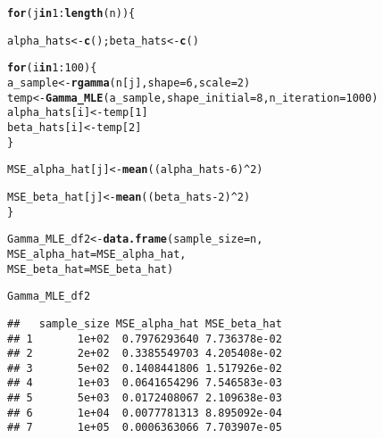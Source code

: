 \documentclass[11pt, a4paper]{article}\usepackage[]{graphicx}\usepackage[]{xcolor}
\makeatletter
\newcommand{\hlnum}[1]{\textcolor[rgb]{0.686,0.059,0.569}{#1}}%
\newcommand{\hlopt}[1]{\textcolor[rgb]{0,0,0}{#1}}%
\newcommand{\hldef}[1]{\textcolor[rgb]{0.345,0.345,0.345}{#1}}%
\newcommand{\hlkwa}[1]{\textcolor[rgb]{0.161,0.373,0.58}{\textbf{#1}}}%
\newcommand{\hlkwb}[1]{\textcolor[rgb]{0.69,0.353,0.396}{#1}}%
\newcommand{\hlkwc}[1]{\textcolor[rgb]{0.333,0.667,0.333}{#1}}%
\newcommand{\hlkwd}[1]{\textcolor[rgb]{0.737,0.353,0.396}{\textbf{#1}}}%
\newenvironment{kframe}{%
 \def\at@end@of@kframe{}%
 \ifinner\ifhmode%
  \def\at@end@of@kframe{\end{minipage}}%
  \begin{minipage}{\columnwidth}%
 \fi\fi%
 \def\FrameCommand##1{\hskip\@totalleftmargin \hskip-\fboxsep
 \colorbox{shadecolor}{##1}\hskip-\fboxsep
     \hskip-\linewidth \hskip-\@totalleftmargin \hskip\columnwidth}%
 \MakeFramed {\advance\hsize-\width
   \@totalleftmargin\z@ \linewidth\hsize
   \@setminipage}}%
 {\par\unskip\endMakeFramed%
 \at@end@of@kframe}
\newenvironment{knitrout}{}{} %
\makeatother
\begin{document}
\begin{knitrout}
\color{fgcolor}\begin{kframe}
\begin{alltt}
\hlkwa{for}\hldef{(j} \hlkwa{in} \hlnum{1}\hlopt{:}\hlkwd{length}\hldef{(n))\{}

  \hldef{alpha_hats} \hlkwb{<-} \hlkwd{c}\hldef{(); beta_hats} \hlkwb{<-} \hlkwd{c}\hldef{()}

  \hlkwa{for} \hldef{(i} \hlkwa{in} \hlnum{1}\hlopt{:}\hlnum{100}\hldef{) \{}
    \hldef{a_sample} \hlkwb{<-} \hlkwd{rgamma}\hldef{(n[j],} \hlkwc{shape} \hldef{=} \hlnum{6}\hldef{,} \hlkwc{scale} \hldef{=} \hlnum{2}\hldef{)}
    \hldef{temp} \hlkwb{<-} \hlkwd{Gamma_MLE}\hldef{(a_sample,} \hlkwc{shape_initial} \hldef{=} \hlnum{8}\hldef{,} \hlkwc{n_iteration} \hldef{=} \hlnum{1000}\hldef{)}
    \hldef{alpha_hats[i]} \hlkwb{<-} \hldef{temp[}\hlnum{1}\hldef{]}
    \hldef{beta_hats[i]} \hlkwb{<-} \hldef{temp[}\hlnum{2}\hldef{]}
  \hldef{\}}

  \hldef{MSE_alpha_hat[j]} \hlkwb{<-} \hlkwd{mean}\hldef{( (alpha_hats} \hlopt{-} \hlnum{6}\hldef{)}\hlopt{^}\hlnum{2} \hldef{)}

  \hldef{MSE_beta_hat[j]} \hlkwb{<-} \hlkwd{mean}\hldef{( (beta_hats} \hlopt{-} \hlnum{2}\hldef{)}\hlopt{^}\hlnum{2} \hldef{)}
\hldef{\}}
\end{alltt}
\end{kframe}
\end{knitrout}

\begin{knitrout}
\color{fgcolor}\begin{kframe}
\begin{alltt}
\hldef{Gamma_MLE_df2} \hlkwb{<-} \hlkwd{data.frame}\hldef{(}\hlkwc{sample_size} \hldef{= n,}
                            \hlkwc{MSE_alpha_hat} \hldef{= MSE_alpha_hat,}
                            \hlkwc{MSE_beta_hat} \hldef{= MSE_beta_hat)}
\end{alltt}
\end{kframe}
\end{knitrout}

\begin{knitrout}
\color{fgcolor}\begin{kframe}
\begin{alltt}
\hldef{Gamma_MLE_df2}
\end{alltt}
\begin{verbatim}
##   sample_size MSE_alpha_hat MSE_beta_hat
## 1       1e+02  0.7976293640 7.736378e-02
## 2       2e+02  0.3385549703 4.205408e-02
## 3       5e+02  0.1408441806 1.517926e-02
## 4       1e+03  0.0641654296 7.546583e-03
## 5       5e+03  0.0172408067 2.109638e-03
## 6       1e+04  0.0077781313 8.895092e-04
## 7       1e+05  0.0006363066 7.703907e-05
\end{verbatim}
\end{kframe}
\end{knitrout}
\end{document}
